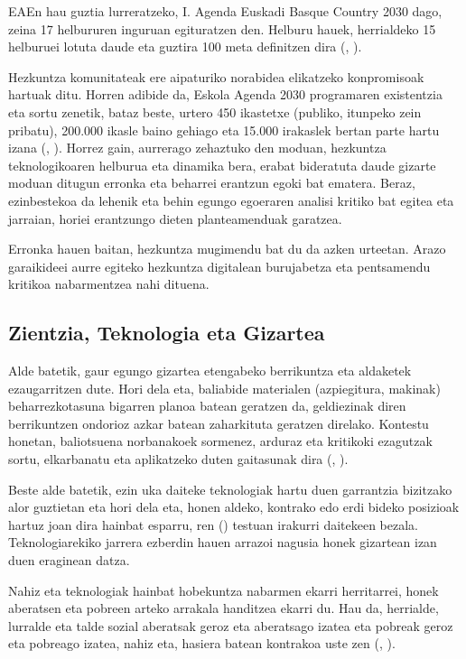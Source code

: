 EAEn hau guztia lurreratzeko, I. Agenda Euskadi Basque Country 2030 dago, zeina 17 helbururen inguruan egituratzen den. Helburu hauek, herrialdeko 15 helburuei lotuta daude eta guztira 100 meta definitzen dira (\citeauthor{vasco2017contribucion}, \citeyear{vasco2017contribucion}).

Hezkuntza komunitateak ere aipaturiko norabidea elikatzeko konpromisoak hartuak ditu. Horren adibide da, Eskola Agenda 2030 programaren existentzia eta sortu zenetik, bataz beste, urtero 450 ikastetxe (publiko, itunpeko zein pribatu), 200.000 ikasle baino gehiago eta 15.000 irakaslek bertan parte hartu izana (\citeauthor{dv2021}, \citeyear{dv2021}). Horrez gain, aurrerago zehaztuko den moduan, hezkuntza teknologikoaren helburua eta dinamika bera, erabat bideratuta daude gizarte moduan ditugun erronka eta beharrei erantzun egoki bat ematera. Beraz, ezinbestekoa da lehenik eta behin egungo egoeraren analisi kritiko bat egitea eta jarraian, horiei erantzungo dieten planteamenduak garatzea. 

Erronka hauen baitan, hezkuntza mugimendu bat du da azken urteetan. Arazo garaikideei aurre egiteko hezkuntza digitalean burujabetza eta pentsamendu kritikoa nabarmentzea nahi dituena.

\subsection{Zientzia, Teknologia eta Gizartea}\label{subsec:ztg}

Alde batetik, gaur egungo gizartea etengabeko berrikuntza eta aldaketek ezaugarritzen dute. Hori dela eta, baliabide materialen (azpiegitura, makinak) beharrezkotasuna bigarren planoa batean geratzen da, geldiezinak diren berrikuntzen ondorioz azkar batean zaharkituta geratzen direlako. Kontestu honetan, baliotsuena norbanakoek sormenez, arduraz eta kritikoki ezagutzak sortu, elkarbanatu eta aplikatzeko duten gaitasunak dira (\citeauthor{acevedo1998ciencia}, \citeyear{acevedo1998ciencia}). 

Beste alde batetik, ezin uka daiteke teknologiak hartu duen garrantzia bizitzako alor guztietan eta hori dela eta, honen aldeko, kontrako edo erdi bideko posizioak hartuz joan dira hainbat esparru, \citeauthor{acevedo1998ciencia}ren (\citeyear{acevedo1998ciencia}) testuan irakurri daitekeen bezala. Teknologiarekiko jarrera ezberdin hauen arrazoi nagusia honek gizartean izan duen eraginean datza.

Nahiz eta teknologiak hainbat hobekuntza nabarmen ekarri herritarrei, honek aberatsen eta pobreen arteko arrakala handitzea ekarri du. Hau da, herrialde, lurralde eta talde sozial aberatsak geroz eta aberatsago izatea eta pobreak geroz eta pobreago izatea, nahiz eta, hasiera batean kontrakoa uste zen (\citeauthor{osorio2002educacion}, \citeyear{osorio2002educacion}).

